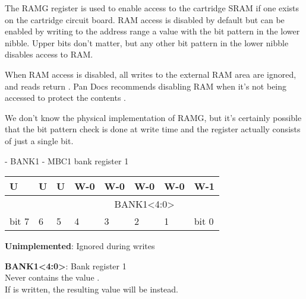 The RAMG register is used to enable access to the cartridge SRAM if one exists
on the cartridge circuit board. RAM access is disabled by default but can be
enabled by writing to the  address range a value with the
bit pattern  in the lower nibble. Upper bits don't matter, but any
other bit pattern in the lower nibble disables access to RAM.

When RAM access is disabled, all writes to the external RAM area
 are ignored, and reads return . Pan Docs
recommends disabling RAM when it's not being accessed to protect the contents
\cite{pandocs}.

\begin{speculation}
  We don't know the physical implementation of RAMG, but it's certainly
  possible that the  bit pattern check is done at write time and the
  register actually consists of just a single bit.
\end{speculation}

\begin{register}[H]
  \caption{ - BANK1 - MBC1 bank register 1}

  {
    \ttfamily
    \begin{tabularx}{\textwidth}{|X|X|X|X|X|X|X|X|}
      \hline
      U                     & U                     & U                     & W-0                                  & W-0 & W-0 & W-0 & W-1   \\
      \hline
      \cellcolor{LightGray} & \cellcolor{LightGray} & \cellcolor{LightGray} & \multicolumn{5}{c|}{BANK1<4:0>} \\
      \hline
      bit 7                 & 6                     & 5                     & 4                                    & 3   & 2   & 1   & bit 0 \\
      \hline
    \end{tabularx}
  }

  \begin{description}[leftmargin=5em, style=nextline]
    \item[bit 7-5]
      \textbf{Unimplemented}: Ignored during writes
    \item[bit 4-0]
      \textbf{BANK1<4:0>}: Bank register 1 \\
      Never contains the value . \\
      If  is written, the resulting value will be  instead.
  \end{description}
\end{register}

